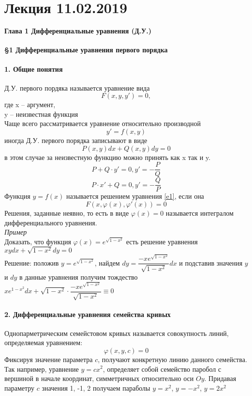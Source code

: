 \documentclass{article}
\numberwithin{equation}{section}
\begin{document}
\section{Лекция 11.02.2019}
\textbf{\Large{Глава 1 Дифференциальные уравнения (Д.У.)}}
\\\\
\textbf{\large{\S1 Дифференциальные уравнения первого порядка}}
\\\\
\textbf{1. Общие понятия}
\\\\
Д.У. первого пордяка называется уравнение вида
\begin{equation}\label{e1}
F(x,y,y')=0,
\end{equation}
где x -- аргумент,\\
y -- неизвестная функция\\
Чаще всего рассматривается уравнение относительно производной
\begin{equation}\label{e2}
y'=f(x,y)
\end{equation}
иногда Д.У. первого порядка записывают в виде
\begin{equation}\label{e3}
P(x,y)dx+Q(x,y)dy=0
\end{equation}
в этом случае за неизвестную функцию можно принять как x так и y.
$$P+Q\cdot y'=0, y'=-\dfrac{P}{Q}$$
$$P\cdot x'+Q=0, y'=-\dfrac{Q}{P}$$
Функция $y=f(x)$ называется решением уравнения \ref{e1}, если она
$$F(x,\varphi(x),\varphi'(x))=0$$
Решения, заданные неявно, то есть в виде $\varphi(x)=0$ называется интегралом дифференциального уравнения.\\
\textit{Пример}\\
Доказать, что функция $\varphi(x)=e^{\sqrt{1-x^2}}$ есть решение уравнения $xydx+\sqrt{1-x^2}dy=0$\\
Решение: положив $y=e^{\sqrt{1-x^2}}$, найдем $dy=\dfrac{-xe^{\sqrt{1-x^2}}}{\sqrt{1-x^2}}dx$ и подставив значения $y$ и $dy$ в данные уравнения получим тождество $xe^{1-x^2}dx+\sqrt{1-x^2}\cdot\dfrac{-xe^{\sqrt{1-x^2}}}{\sqrt{1-x^2}}\equiv0$
\\\\
\textbf{2. Дифференциальные уравнения семейства кривых}
\\\\
Однопарметрическим семейстовом кривых называется совокупность линий, определяемая уравнением:
\begin{equation}\label{e4}
\varphi(x,y,c)=0
\end{equation}
Фиксируя значение параметра $c$, получают конкретную линию данного семейства. Так например, уравнение $y=cx^2$, определяет собой семейство паробол с вершиной в начале координат, симметричных относительно оси $Oy$. Придавая параметру $c$ значения 1, -1, 2 получаем параболы $y=x^2$, $y=-x^2$, $y=2x^2$\\\\
\end{document}
